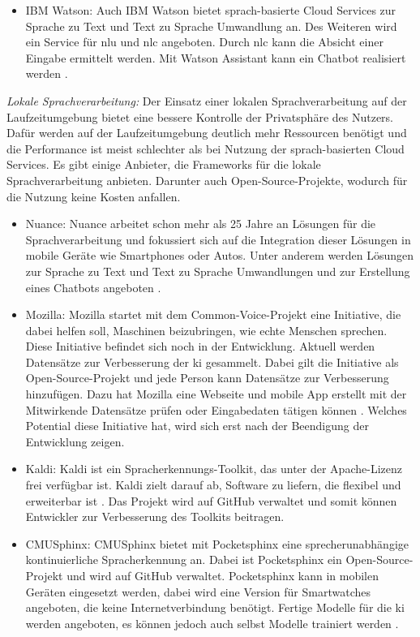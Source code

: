 \begin{description}
\begin{itemize}
		\item IBM Watson: Auch IBM Watson bietet sprach-basierte Cloud Services zur Sprache zu Text und Text zu Sprache Umwandlung an. Des Weiteren wird ein Service für \ac{nlu} und \ac{nlc} angeboten. Durch \ac{nlc} kann die Absicht einer Eingabe ermittelt werden. Mit Watson Assistant kann ein Chatbot realisiert werden \cite{IBMWatsonSpeechServices}.
	\end{itemize}
	\item \textit{Lokale Sprachverarbeitung:} Der Einsatz einer lokalen Sprachverarbeitung auf der Laufzeitumgebung bietet eine bessere Kontrolle der Privatsphäre des Nutzers. Dafür werden auf der Laufzeitumgebung deutlich mehr Ressourcen benötigt und die Performance ist meist schlechter als bei Nutzung der sprach-basierten Cloud Services. Es gibt einige Anbieter, die Frameworks für die lokale Sprachverarbeitung anbieten. Darunter auch Open-Source-Projekte, wodurch für die Nutzung keine Kosten anfallen. 
	\begin{itemize}
		\item Nuance: Nuance arbeitet schon mehr als 25 Jahre an Lösungen für die Sprachverarbeitung und fokussiert sich auf die Integration dieser Lösungen in mobile Geräte wie Smartphones oder Autos. Unter anderem werden Lösungen zur Sprache zu Text und Text zu Sprache Umwandlungen und zur Erstellung eines Chatbots angeboten \cite{Nuance}. 
		\item Mozilla: Mozilla startet mit dem Common-Voice-Projekt eine Initiative, die dabei helfen soll, Maschinen beizubringen, wie echte Menschen sprechen. Diese Initiative befindet sich noch in der Entwicklung. Aktuell werden Datensätze zur Verbesserung der \ac{ki} gesammelt. Dabei gilt die Initiative als Open-Source-Projekt und jede Person kann Datensätze zur Verbesserung hinzufügen. Dazu hat Mozilla eine Webseite und mobile App erstellt mit der Mitwirkende Datensätze prüfen oder Eingabedaten tätigen können \cite{MozillaCommonVoice}. Welches Potential diese Initiative hat, wird sich erst nach der Beendigung der Entwicklung zeigen.
		\item Kaldi: Kaldi ist ein Spracherkennungs-Toolkit, das unter der Apache-Lizenz frei verfügbar ist. Kaldi zielt darauf ab, Software zu liefern, die flexibel und erweiterbar ist \cite{Kaldi}. Das Projekt wird auf GitHub verwaltet und somit können Entwickler zur Verbesserung des Toolkits beitragen.
		\item CMUSphinx: CMUSphinx bietet mit Pocketsphinx eine sprecherunabhängige kontinuierliche Spracherkennung an. Dabei ist Pocketsphinx ein Open-Source-Projekt und wird auf GitHub verwaltet. Pocketsphinx kann in mobilen Geräten eingesetzt werden, dabei wird eine Version für Smartwatches angeboten, die keine Internetverbindung benötigt. Fertige Modelle für die \ac{ki} werden angeboten, es können jedoch auch selbst Modelle trainiert werden \cite{Pocketsphinx}.
	\end{itemize}
\end{description}

